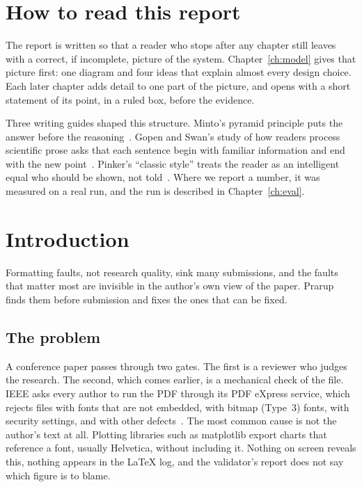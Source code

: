 \documentclass[11pt,a4paper,oneside,openany]{book}
\begin{document}
\chapter*{How to read this report}
The report is written so that a reader who stops after any chapter still leaves with a correct, if
incomplete, picture of the system. Chapter~\ref{ch:model} gives that picture first: one diagram and four
ideas that explain almost every design choice. Each later chapter adds detail to one part of the picture,
and opens with a short statement of its point, in a ruled box, before the evidence.

Three writing guides shaped this structure. Minto's pyramid principle puts the answer before the
reasoning~\cite{minto}. Gopen and Swan's study of how readers process scientific prose asks that each
sentence begin with familiar information and end with the new point~\cite{gopen}. Pinker's ``classic
style'' treats the reader as an intelligent equal who should be shown, not told~\cite{pinker}. Where we
report a number, it was measured on a real run, and the run is described in Chapter~\ref{ch:eval}.

\tableofcontents

\mainmatter

\chapter{Introduction}\label{ch:intro}

\begin{takeaway}
Formatting faults, not research quality, sink many submissions, and the faults that matter most are
invisible in the author's own view of the paper. Prarup finds them before submission and fixes the ones
that can be fixed.
\end{takeaway}

\section{The problem}
A conference paper passes through two gates. The first is a reviewer who judges the research. The second,
which comes earlier, is a mechanical check of the file. IEEE asks every author to run the PDF through its
PDF eXpress service, which rejects files with fonts that are not embedded, with bitmap (Type~3) fonts, with
security settings, and with other defects~\cite{pdfexpress}. The most common cause is not the author's text
at all. Plotting libraries such as matplotlib export charts that reference a font, usually Helvetica,
without including it. Nothing on screen reveals this, nothing appears in the \LaTeX{} log, and the
validator's report does not say which figure is to blame.
\end{document}
